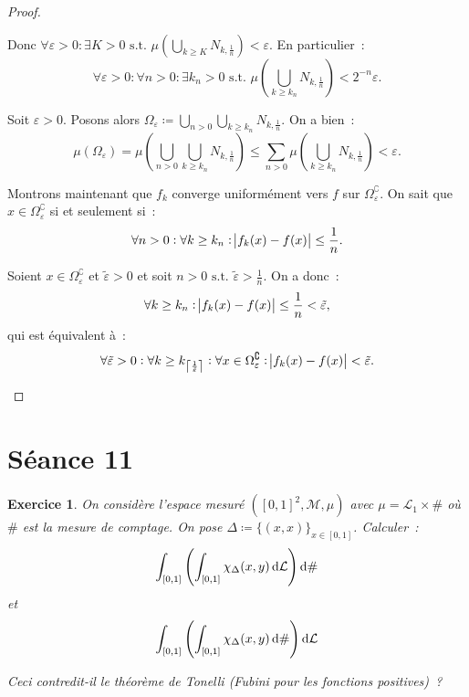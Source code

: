 \documentclass{article}
\newtheorem{ex}{Exercice}[section]
\newcommand{\st}{\text{ s.t. }}
\newcommand{\C}{\complement}
\begin{document}
\begin{proof}
\begin{enumerate}
	Donc $\forall \varepsilon > 0 : \exists K > 0 \st \mu(\bigcup_{k \geq K}N_{k,\frac 1n}) < \varepsilon$. En particulier~:
	\[\forall \varepsilon > 0 : \forall n > 0 : \exists k_n > 0 \st \mu\left(\bigcup_{k \geq k_n}N_{k,\frac 1n}\right) < 2^{-n}\varepsilon.\]

	Soit $\varepsilon > 0$. Posons alors $\Omega_\varepsilon \coloneqq \bigcup_{n > 0}\bigcup_{k \geq k_n}N_{k,\frac 1n}$. On a bien~:
	\[\mu(\Omega_\varepsilon) = \mu\left(\bigcup_{n > 0}\bigcup_{k \geq k_n}N_{k,\frac 1n}\right) \leq \sum_{n > 0}\mu\left(\bigcup_{k \geq k_n}N_{k,\frac 1n}\right) < \varepsilon.\]

	Montrons maintenant que $f_k$ converge uniformément vers $f$ sur $\Omega_\varepsilon^\C$. On sait que $x \in \Omega_\varepsilon^\C$ si et seulement si~:
	\[\forall n > 0 : \forall k \geq k_n : \abs {f_k(x)-f(x)} \leq \frac 1n.\]

	Soient $x \in \Omega_\varepsilon^\C$ et $\tilde \varepsilon > 0$ et soit $n > 0 \st \tilde \varepsilon > \frac 1n$. On a donc~:
	\[\forall k \geq k_n : \abs {f_k(x)-f(x)} \leq \frac 1n < \tilde \varepsilon,\]
	qui est équivalent à~:
	\[\forall \tilde \varepsilon > 0 : \forall k \geq k_{\left\lceil\frac 1{\tilde \varepsilon}\right\rceil} : \forall x \in \Omega_\varepsilon^\C : \abs {f_k(x)-f(x)} < \tilde\varepsilon.\]
\end{enumerate}
\end{proof}

\newpage
\section{Séance 11}

\begin{ex} On considère l'espace mesuré $([0, 1]^2, \mathcal M, \mu)$ avec $\mu = \mathcal L_1 \times \#$ où $\#$ est la mesure de comptage. On pose
$\Delta \coloneqq \{(x, x)\}_{x \in [0, 1]}$. Calculer~:
\[\int_{[0, 1]}\left(\int_{[0, 1]}\chi_\Delta(x, y)\dif\mathcal L\right)\dif\#\]
et
\[\int_{[0, 1]}\left(\int_{[0, 1]}\chi_\Delta(x, y)\dif\#\right)\dif\mathcal L\]

Ceci contredit-il le théorème de Tonelli (Fubini pour les fonctions positives)~?
\end{ex}
\end{document}
